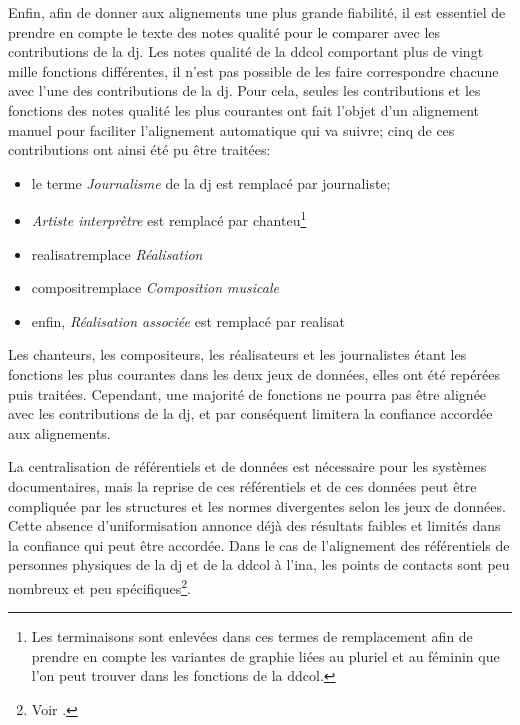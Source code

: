 Enfin, afin de donner aux alignements une plus grande fiabilité, il est essentiel de prendre en compte le texte des notes qualité pour le comparer avec les contributions de la \ac{dj}. Les notes qualité de la \ac{ddcol} comportant plus de vingt mille fonctions différentes, il n'est pas possible de les faire correspondre chacune avec l'une des contributions de la \ac{dj}. Pour cela, seules les contributions et les fonctions des notes qualité les plus courantes ont fait l'objet d'un alignement manuel pour faciliter l'alignement automatique qui va suivre; cinq de ces contributions ont ainsi été pu être traitées:
\begin{itemize}
	\item le terme \textit{Journalisme} de la \ac{dj} est remplacé par \og journaliste\fg{};
	\item \textit{Artiste interprètre} est remplacé par \og chanteu\fg{}\footnote{Les terminaisons sont enlevées dans ces termes de remplacement afin de prendre en compte les variantes de graphie liées au pluriel et au féminin que l'on peut trouver dans les fonctions de la \ac{ddcol}.}
	\item \og realisat\fg remplace \textit{Réalisation}
	\item \og composit\fg remplace \textit{Composition musicale}
	\item enfin, \textit{Réalisation associée} est remplacé par \og realisat\fg{}
\end{itemize}
\medskip
Les chanteurs, les compositeurs, les réalisateurs et les journalistes étant les fonctions les plus courantes dans les deux jeux de données, elles ont été repérées puis traitées. Cependant, une majorité de fonctions ne pourra pas être alignée avec les contributions de la \ac{dj}, et par conséquent limitera la confiance accordée aux alignements.


\bigskip
\bigskip
La centralisation de référentiels et de données est nécessaire pour les systèmes documentaires, mais la reprise de ces référentiels et de ces données peut être compliquée par les structures et les normes divergentes selon les jeux de données. Cette absence d'uniformisation annonce déjà des résultats faibles et limités dans la confiance qui peut être accordée. Dans le cas de l'alignement des référentiels de personnes physiques de la \ac{dj} et de la \ac{ddcol} à l'\ac{ina}, les points de contacts sont peu nombreux et peu spécifiques\footnote{Voir .}.

